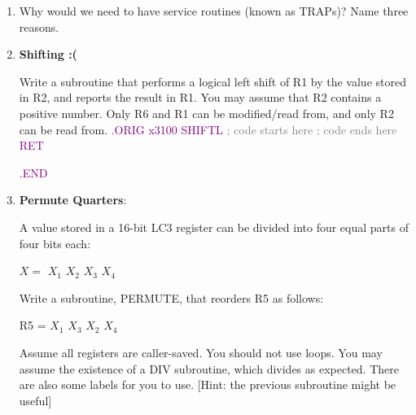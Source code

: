 \documentclass{article}
\begin{document}
\begin{enumerate}[label=(\alph*)]

\item Why would we need to have service routines (known as TRAPs)? Name three reasons.
\newline
\newline
\newline
\newline
\newline
\newline


    \item \textbf{Shifting :(}

    Write a subroutine that performs a logical left shift of R1 by the value stored in R2, and reports the result in R1. You may assume that R2 contains a positive number. Only R6 and R1 can be modified/read from, and only R2 can be read from.
    \newpage
    \textcolor{purple}{.ORIG x3100}
    \newline
    \textcolor{purple}{SHIFTL}
    \newline
    \textcolor{gray}{; code starts here}
    \newline
    \newline
    \newline
    \newline
    \newline
    \newline
    \newline
    \newline
    \textcolor{gray}{; code ends here}
    \newline
    \textcolor{purple}{RET}

    \textcolor{purple}{.END}



    \item  \textbf{Permute Quarters}:

   A value stored in a 16-bit LC3 register can be divided into four equal parts of four bits each:
    \begin{center}
        $X = $ $X_1$ $X_2$ $X_3$ $X_4$ \\
    \end{center}
Write a subroutine, PERMUTE, that reorders R5 as follows:
\begin{center}
R5 = $X_1$ $X_3$ $X_2$ $X_4$    
\end{center}

Assume all registers are caller-saved. You should not use loops. You may assume the existence of a DIV subroutine, which divides as expected. There are also some labels for you to use. [Hint: the previous subroutine might be useful]


\end{enumerate}
\end{document}
